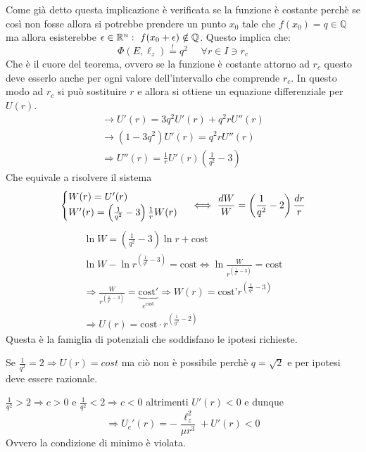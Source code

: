 \documentclass[Main.tex]{subfiles}
\begin{document}
\begin{dm}
\begin{itemize}
	Come già detto questa implicazione è verificata se la funzione è costante perchè se così non fosse allora si potrebbe prendere un punto $x_0$ tale che $f(x_0)=q \in \mathbb{Q}$ ma allora esisterebbe $\epsilon \in \Rr^n : \ f(x_0 + \epsilon) \notin \mathbb{Q}$. Questo implica che:
	\begin{equation}
		\Phi(E, \ell_z) \overset{!}{=} q^2  \ \ \ \ \ \ \forall r \in I \ni r_c
	\end{equation}
	Che è il cuore del teorema, ovvero se la funzione è costante attorno ad $r_c$ questo deve esserlo anche per ogni valore dell'intervallo che comprende $r_c$. In questo modo ad $r_c$ si può sostituire $r$ e allora si ottiene un equazione differenziale per $U(r)$.
	\begin{gather}
		\rightarrow U'(r) = 3q^2 U'(r) + q^2r U''(r)\\
		\rightarrow (1-3q^2)U'(r) = q^2r U''(r)\\
		\Rightarrow \boxed{ U''(r) = \frac{1}{r} U'(r) \left( \frac{1}{q^2} -3 \right) }
	\end{gather}
	Che equivale a risolvere il sistema
	\begin{equation}\notag
		\begin{cases}
			W(r)= U'(r)\\
			W'(r) = \left( \frac{1}{q^2} - 3 \right) \frac{1}{r} W(r) 
		\end{cases} \iff \frac{dW}{W} = \left( \frac{1}{q^2}-2 \right) \frac{dr}{r}
	\end{equation}
	\begin{gather*}
		\ln W = \left( \frac{1}{q^2} - 3 \right) \ln r + \text{cost}\\
		\ln W - \ln r ^{\left( \frac{1}{q^2} - 3 \right)}= \text{cost} 
		\iff \ln \frac{W}{r^{\left( \frac{1}{q^2} - 3 \right)}} = \text{cost} \\ \Rightarrow \frac{W}{r^{\left( \frac{1}{q^2} - 3 \right)}}= \underbrace{\text{cost}'}_{e^\text{cost}}
		\Rightarrow W(r) = \text{cost'} r^{\left( \frac{1}{q^2} - 3 \right)}\\
		\Rightarrow \boxed{U(r)= \text{cost} \cdot r^{\left( \frac{1}{q^2} - 2 \right)}}
	\end{gather*}
	Questa è la famiglia di potenziali che soddisfano le ipotesi richieste. 
	
	

\end{itemize}
\end{dm}
\end{document}

